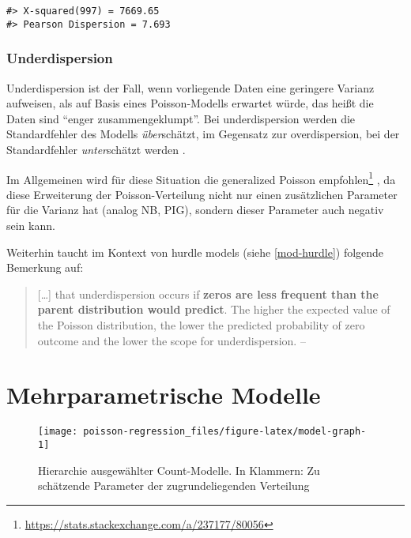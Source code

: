 \documentclass[ngerman,a4paper,]{scrartcl}
\DeclareRobustCommand{\href}[2]{#2\footnote{\url{#1}}}
\theoremstyle{definition}
\theoremstyle{definition}
\theoremstyle{definition}
\theoremstyle{remark}
\begin{document}
\begin{verbatim}
#> X-squared(997) = 7669.65
#> Pearson Dispersion = 7.693
\end{verbatim}

\hypertarget{underdispersion}{%
\subsubsection{Underdispersion}\label{underdispersion}}

Underdispersion ist der Fall, wenn vorliegende Daten eine geringere Varianz aufweisen, als auf Basis eines Poisson-Modells erwartet würde, das heißt die Daten sind \enquote{enger zusammengeklumpt}.
Bei underdispersion werden die Standardfehler des Modells \emph{über}schätzt, im Gegensatz zur overdispersion, bei der Standardfehler \emph{unter}schätzt werden \citep[p.~210]{hilbeModelingCountData2014}.

Im Allgemeinen wird für diese Situation die \href{https://stats.stackexchange.com/a/237177/80056}{generalized Poisson empfohlen} \citep{hilbeModelingCountData2014}, da diese Erweiterung der Poisson-Verteilung nicht nur einen zusätzlichen Parameter für die Varianz hat (analog NB, PIG), sondern dieser Parameter auch negativ sein kann.

Weiterhin taucht im Kontext von hurdle models (siehe \ref{mod-hurdle}) folgende Bemerkung auf:

\begin{quote}
{[}\ldots{}{]} that underdispersion occurs if \textbf{zeros are less frequent than the parent distribution would predict}.
The higher the expected value of the Poisson distribution, the lower the predicted probability of zero outcome and the lower the scope for underdispersion.
-- \citep[p.~180 (eigene Hervorhebung)]{winkelmannEconometricAnalysisCount2010}
\end{quote}

\hypertarget{multiparam}{%
\section{Mehrparametrische Modelle}\label{multiparam}}

\begin{figure}

{\centering \texttt{[image: poisson-regression\_files/figure-latex/model-graph-1]} 

}

\caption{Hierarchie ausgewählter Count-Modelle. In Klammern: Zu schätzende Parameter der zugrundeliegenden Verteilung}\label{fig:model-graph}
\end{figure}
\end{document}
